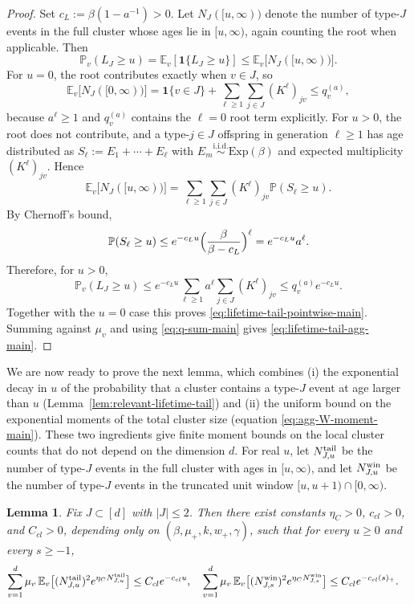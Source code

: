 \documentclass{article}
\newtheorem{lemma}{Lemma}[section]
\newcommand{\Pbb}{\mathbb{P}}
\newcommand{\E}{\mathbb{E}}
\newcommand{\ind}{\mathbf 1}
\begin{document}
\begin{proof}
Set $c_L:=\beta(1-a^{-1})>0$. Let $N_J([u,\infty))$ denote the number of type-$J$ events in the full cluster whose ages lie in $[u,\infty)$, again counting the root when applicable. Then
\[
\Pbb_v(L_J\ge u)=\mathbb E _v[\textbf{1}\{L_J\geq u\}]\le \mathbb E_v\big[N_J([u,\infty))\big].
\]
For $u=0$, the root contributes exactly when $v\in J$, so
\[
\E_v\big[N_J([0,\infty))\big]
=\ind\{v\in J\}+\sum_{\ell\ge 1}\sum_{j\in J}(K^{\ell})_{jv}
\le q_v^{(a)},
\]
because $a^\ell\ge 1$ and $q_v^{(a)}$ contains the $\ell=0$ root term explicitly. For $u>0$, the root does not contribute, and a type-$j\in J$ offspring in generation $\ell\ge 1$ has age distributed as $S_\ell:=E_1+\cdots+E_\ell$ with $E_m\stackrel{\mathrm{i.i.d.}}{\sim}\mathrm{Exp}(\beta)$ and expected multiplicity $(K^{\ell})_{jv}$. Hence
\[
\E_v\big[N_J([u,\infty))\big]
=\sum_{\ell\ge 1}\sum_{j\in J}(K^{\ell})_{jv}\Pbb(S_\ell\ge u).
\]
By Chernoff's bound,
\[
\Pbb(S_\ell\ge u)
\le e^{-c_L u}\Bigl(\frac{\beta}{\beta-c_L}\Bigr)^{\ell}
=e^{-c_L u} a^{\ell}.
\]
Therefore, for $u>0$,
\[
\Pbb_v(L_J\ge u)
\le e^{-c_L u}\sum_{\ell\ge 1}a^{\ell}\sum_{j\in J}(K^{\ell})_{jv}
\le q_v^{(a)} e^{-c_L u}.
\]
Together with the $u=0$ case this proves \eqref{eq:lifetime-tail-pointwise-main}. Summing against $\mu_v$ and using \eqref{eq:q-sum-main} gives \eqref{eq:lifetime-tail-agg-main}.
\end{proof}
We are now ready to prove the next lemma, which combines (i) the exponential decay in $u$ of the probability that a cluster contains a type-$J$ event at age larger than $u$ (Lemma~\ref{lem:relevant-lifetime-tail}) and (ii) the uniform bound on the exponential moments of the total cluster size (equation \eqref{eq:agg-W-moment-main}). These two ingredients give finite moment bounds on the local cluster counts that do not depend on the dimension $d$. For real $u$, let $N_{J,u}^{\rm tail}$ be the number of type-$J$ events in the full cluster with ages in $[u,\infty)$, and let $N_{J,u}^{\rm win}$ be the number of type-$J$ events in the truncated unit window $[u,u+1)\cap[0,\infty)$.
\begin{lemma}
\label{lem:local-count-moments}
Fix $J\subset[d]$ with $|J|\le 2$. Then there exist constants $\eta_C>0$, $c_{cl}>0$, and $C_{cl}>0$, depending only on $(\beta,\mu_+,k,w_+,\gamma)$, such that for every $u\ge 0$ and every $s\ge -1$,
\begin{align}
\sum_{v=1}^d \mu_v\,\mathbb E_v\big[(N_{J,u}^{\rm tail})^2 e^{\eta_C N_{J,u}^{\rm tail}}\big]&\le C_{cl} e^{-c_{cl} u}, \quad \sum_{v=1}^d \mu_v\,\mathbb E_v\big[(N_{J,s}^{\rm win})^2 e^{\eta_C N_{J,s}^{\rm win}}\big]\le C_{cl} e^{-c_{cl} (s)_+}. 
\label{eq:tail-count-moment-main} 
\end{align}
\end{lemma}
\end{document}
